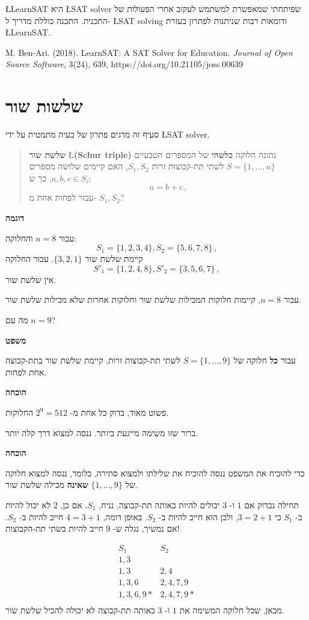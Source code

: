 \documentclass[12pt,a4paper]{article}
\begin{document}
\L{LearnSAT}
היא
\L{SAT solver}
שפיתחתי שמאפשרת למשתמש לעקוב אחרי הפעולות של התכנית. התכנה כוללת מדריך ל-%
\L{SAT solving}
ודומאות רבות שניתנות לפתרון בעזרת
\L{LearnSAT}.

M. Ben-Ari. (2018). LearnSAT: A SAT Solver for Education. \textit{Journal of Open Source Software}, 3(24), 639, https://doi.org/10.21105/joss.00639

\section{שלשות שור}

סעיף זה מדגים פתרון של בעיה מתמטית על ידי
\L{SAT solver}.

\begin{quote}
\textbf{שלשת שור} \L{\textbf{(Schur triple)}}
נתונה חלוקה
\textbf{כלשהי}
של המספרים הטבעיים
$S=\{1,\ldots,n\}$
לשתי תת-קבוצות זרות
$S_1,S_2$,
האם קיימים שלושה מספרים
$a,b,c\in S_i$,
כך ש:
\[
a=b+c\,,
\]
עבור לפחות אחת מ-%
$S_1,S_2$?
\end{quote}

\textbf{דוגמה}

עבור
$n=8$
והחלוקה:
\[
S_1 = \{1,2,3,4\}, S_2 = \{5,6,7,8\}\,,
\]
קיימת שלשת שור
$\{3,2,1\}$.
עבור החלוקה
\[
S'_1 = \{1,2,4,8\}, S'_2 = \{3,5,6,7\}\,,
\]
אין שלשת שור.

עבור
$n=8$,
קיימות חלוקות המכילות שלשת שור וחלוקות אחרות שלא מכילות שלשת שור.

מה עם
$n=9$?

\textbf{משפט}

עבור
\textbf{כל}
חלוקה של
$S=\{1,\ldots,9\}$
לשתי תת-קבוצות זרות, קיימת שלשת שור בתת-קבוצה אחת לפחות.

\textbf{הוכחה}

פשוט מאוד, בדוק כל אחת מ-%
$2^9=512$
החלוקות.

ברור שזו משימה מייגעת ביותר. ננסה למצוא דרך קלה יותר.

\textbf{הוכחה}

כדי להוכיח את המשפט ננסה להוכיח את שלילתו ולמצוא סתירה, כלומר, ננסה למצוא חלוקה של 
$\{1,\ldots,9\}$
\textbf{שאינה}
מכילה שלשת שור.

תחילה נבדוק אם 
$1$
ו-%
$3$
יכולים להיות באותה תת-קבוצה, נניח, 
$S_1$.
אם כן, 
$2$
לא יכול להיות ב-%
$S_1$
כי
$3=2+1$, 
ולכן הוא חייב להיות ב-%
$S_2$.
באופן דומה,
$4=3+1$
חייב להיות ב-%
$S_2$.
אם נמשיך, נגלה ש-%
$9$
חייב להיות בשתי תת-הקבוצות!

\begin{displaymath}
\begin{array}{ll}
S_1 & S_2\\
1,3 & \\
1,3 & 2,4\\
1,3,6 & 2,4,7,9\\
1,3,6,9* & 2,4,7,9*\\
\end{array}
\end{displaymath}
מכאן, שכל חלוקה המשימה את
$1$
ו-%
$3$
באותה תת-קבוצה לא יכולה להכיל שלשת שור.
\end{document}
